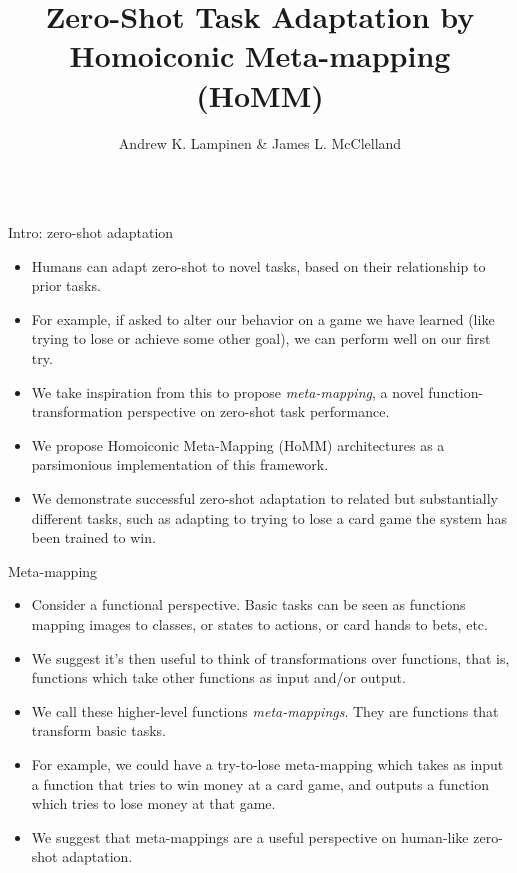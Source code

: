 \documentclass[final]{beamer}
\title{Zero-Shot Task Adaptation by Homoiconic Meta-mapping (HoMM)}
\author{Andrew K. Lampinen \& James L. McClelland}
\institute{Department of Psychology, Stanford University}
\begin{document}
\begin{frame}[t]{}
\vspace{-1em}
\begin{columns}

\begin{column}[t]{0.248\textwidth}
\begin{block}{\huge Intro: zero-shot adaptation}
\vspace{-0.4em}
\begin{itemize}
\item Humans can adapt zero-shot to novel tasks, based on their relationship to prior tasks.
\item For example, if asked to alter our behavior on a game we have learned (like trying to lose or achieve some other goal), we can perform well on our first try.
\item We take inspiration from this to propose \emph{meta-mapping}, a novel function-transformation perspective on zero-shot task performance.
\item We propose Homoiconic Meta-Mapping (HoMM) architectures as a parsimonious implementation of this framework.
\item We demonstrate successful zero-shot adaptation to related but substantially different tasks, such as adapting to trying to lose a card game the system has been trained to win.
\end{itemize}
\end{block}
\begin{block}{\huge Meta-mapping}
\vspace{-0.4em}
\begin{itemize}
\item Consider a functional perspective. Basic tasks can be seen as functions mapping images to classes, or states to actions, or card hands to bets, etc.
\item We suggest it's then useful to think of transformations over functions, that is, functions which take other functions as input and/or output.
\item We call these higher-level functions \emph{meta-mappings}. They are functions that transform basic tasks. 
\item For example, we could have a try-to-lose meta-mapping which takes as input a function that tries to win money at a card game, and outputs a function which tries to lose money at that game.
\item We suggest that meta-mappings are a useful perspective on human-like zero-shot adaptation.
\end{itemize}

\end{block}
\end{column}
\end{columns}
\end{frame}
\end{document}
